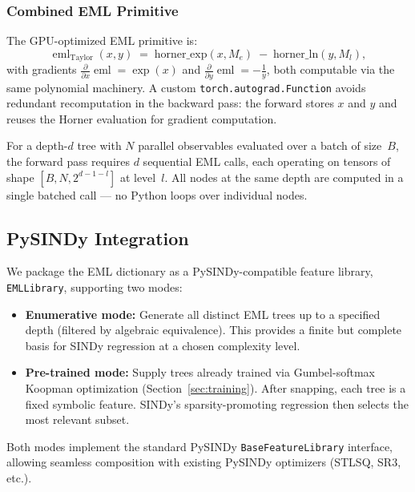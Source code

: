 \documentclass[11pt]{article}
\DeclareMathOperator{\eml}{eml}
\begin{document}
\subsubsection{Combined EML Primitive}

The GPU-optimized EML primitive is:
\begin{equation}\label{eq:eml-taylor}
  \eml_{\text{Taylor}}(x, y) \;=\; \text{horner\_exp}(x, M_e) \;-\;
  \text{horner\_ln}(y, M_l),
\end{equation}
with gradients $\frac{\partial}{\partial x}\eml = \exp(x)$ and
$\frac{\partial}{\partial y}\eml = -\frac{1}{y}$, both computable via the same
polynomial machinery.  A custom \texttt{torch.autograd.Function} \citep{paszke2019} avoids redundant
recomputation in the backward pass: the forward stores $x$ and $y$ and reuses the
Horner evaluation for gradient computation.

For a depth-$d$ tree with $N$ parallel observables evaluated over a batch of
size~$B$, the forward pass requires $d$ sequential EML calls, each operating on
tensors of shape $[B, N, 2^{d-1-l}]$ at level~$l$.  All nodes at the same depth
are computed in a single batched call --- no Python loops over individual nodes.


\subsection{PySINDy Integration}
\label{sec:pysindy}

We package the EML dictionary as a PySINDy-compatible feature library,
\texttt{EMLLibrary}, supporting two modes:

\begin{itemize}
  \item \textbf{Enumerative mode:} Generate all distinct EML trees up to a specified
    depth (filtered by algebraic equivalence).  This provides a finite but complete
    basis for SINDy regression at a chosen complexity level.
  \item \textbf{Pre-trained mode:} Supply trees already trained via
    Gumbel-softmax Koopman optimization (Section~\ref{sec:training}).
    After snapping, each tree is a fixed symbolic feature.  SINDy's
    sparsity-promoting regression then selects the most relevant subset.
\end{itemize}

\noindent
Both modes implement the standard PySINDy \texttt{BaseFeatureLibrary} interface,
allowing seamless composition with existing PySINDy optimizers (STLSQ, SR3, etc.).
\end{document}

